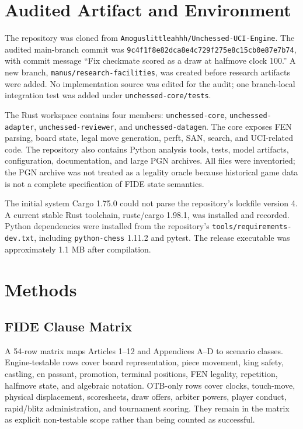 \documentclass[conference]{IEEEtran}
\begin{document}
\section{Audited Artifact and Environment}
The repository was cloned from \texttt{Amoguslittleahhh/Unchessed-UCI-Engine}. The audited main-branch commit was \texttt{9c4f1f8e82dca8e4c729f275e8c15cb0e87e7b74}, with commit message ``Fix checkmate scored as a draw at halfmove clock 100.'' A new branch, \texttt{manus/research-facilities}, was created before research artifacts were added. No implementation source was edited for the audit; one branch-local integration test was added under \texttt{unchessed-core/tests}.

The Rust workspace contains four members: \texttt{unchessed-core}, \texttt{unchessed-adapter}, \texttt{unchessed-reviewer}, and \texttt{unchessed-datagen}. The core exposes FEN parsing, board state, legal move generation, perft, SAN, search, and UCI-related code. The repository also contains Python analysis tools, tests, model artifacts, configuration, documentation, and large PGN archives. All files were inventoried; the PGN archive was not treated as a legality oracle because historical game data is not a complete specification of FIDE state semantics.

The initial system Cargo 1.75.0 could not parse the repository's lockfile version 4. A current stable Rust toolchain, rustc/cargo 1.98.1, was installed and recorded. Python dependencies were installed from the repository's \texttt{tools/requirements-dev.txt}, including \texttt{python-chess} 1.11.2 and pytest. The release executable was approximately 1.1 MB after compilation.

\section{Methods}
\subsection{FIDE Clause Matrix}
A 54-row matrix maps Articles 1--12 and Appendices A--D to scenario classes. Engine-testable rows cover board representation, piece movement, king safety, castling, en passant, promotion, terminal positions, FEN legality, repetition, halfmove state, and algebraic notation. OTB-only rows cover clocks, touch-move, physical displacement, scoresheets, draw offers, arbiter powers, player conduct, rapid/blitz administration, and tournament scoring. They remain in the matrix as explicit non-testable scope rather than being counted as successful.
\end{document}
